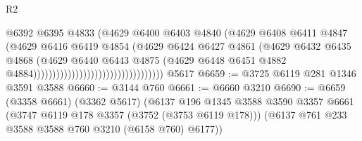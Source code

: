 \begin{lexlean}{R2}
\begin{coremodule}
                                                          @6392
                                                          @6395
                                                          @4833
                                                          (@4629
                                                            @6400
                                                            @6403
                                                            @4840
                                                            (@4629
                                                              @6408
                                                              @6411
                                                              @4847
                                                              (@4629
                                                                @6416
                                                                @6419
                                                                @4854
                                                                (@4629
                                                                  @6424
                                                                  @6427
                                                                  @4861
                                                                  (@4629
                                                                    @6432
                                                                    @6435
                                                                    @4868
                                                                    (@4629
                                                                      @6440
                                                                      @6443
                                                                      @4875
                                                                      (@4629
                                                                        @6448
                                                                        @6451
                                                                        @4882
                                                                        @4884))))))))))))))))))))))))))))))))))
    @5617
@6659 := @3725 @6119 @281 @1346 @3591 @3588
@6660 := @3144 @760
@6661 := @6660 @3210
@6690 := @6659
    (@3358 @6661)
    (@3362 @5617)
    (@6137
      @196
      @1345
      @3588
      @3590
      @3357
      @6661
      (@3747 @6119 @178 @3357 (@3752 (@3753 @6119 @178)))
      (@6137 @761 @233 @3588 @3588 @760 @3210 (@6158 @760) @6177))

\end{coremodule}
\end{lexlean}
